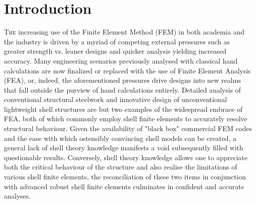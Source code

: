 


\chapter{Introduction}
\label{chap:chapter_1}

\renewcommand{\Thema}{Introduction}

\lettrine[lines=2]{T}{he} increasing use of the Finite Element Method (FEM) in both academia and the industry is driven by a myriad of competing external pressures such as greater strength vs. leaner designs and quicker analysis yielding increased accuracy. Many engineering scenarios previously analysed with classical hand calculations are now finalized or replaced with the use of Finite Element Analysis (FEA), or, indeed, the aforementioned pressures drive designs into new realms that fall outside the purview of hand calculations entirely. Detailed analysis of conventional structural steelwork and innovative design of unconventional lightweight shell structures are but two examples of the widespread embrace of FEA, both of which commonly employ shell finite elements to accurately resolve structural behaviour. Given the availability of "black box" commercial FEM codes and the ease with which ostensibly convincing shell models can be created, a general lack of shell theory knowledge manifests a void subsequently filled with questionable results. Conversely, shell theory knowledge allows one to appreciate both the critical behaviour of the structure and also realise the limitations of various shell finite elements, the reconciliation of these two items in conjunction with advanced robust shell finite elements culminates in confident and accurate analyses.

